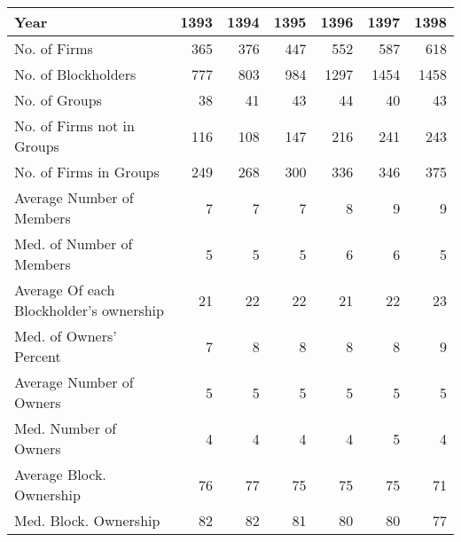 \begin{tabular}{lrrrrrr}
\toprule
Year &  1393 &  1394 &  1395 &  1396 &  1397 &  1398 \\
\midrule
No. of Firms                            &   365 &   376 &   447 &   552 &   587 &   618 \\
No. of Blockholders                     &   777 &   803 &   984 &  1297 &  1454 &  1458 \\
No. of Groups                           &    38 &    41 &    43 &    44 &    40 &    43 \\
No. of Firms not in Groups              &   116 &   108 &   147 &   216 &   241 &   243 \\
No. of Firms in Groups                  &   249 &   268 &   300 &   336 &   346 &   375 \\
Average Number of Members               &     7 &     7 &     7 &     8 &     9 &     9 \\
Med. of  Number of Members              &     5 &     5 &     5 &     6 &     6 &     5 \\
Average Of each Blockholder’s ownership &    21 &    22 &    22 &    21 &    22 &    23 \\
Med. of Owners' Percent                 &     7 &     8 &     8 &     8 &     8 &     9 \\
Average Number of Owners                &     5 &     5 &     5 &     5 &     5 &     5 \\
Med. Number of Owners                   &     4 &     4 &     4 &     4 &     5 &     4 \\
Average Block. Ownership                &    76 &    77 &    75 &    75 &    75 &    71 \\
Med. Block. Ownership                   &    82 &    82 &    81 &    80 &    80 &    77 \\
\bottomrule
\end{tabular}
